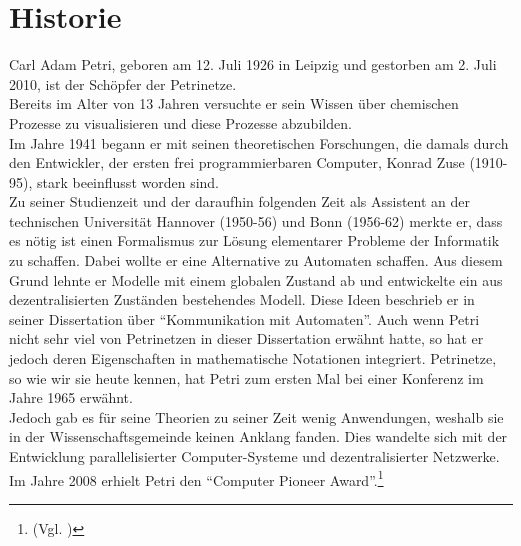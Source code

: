 \section{Historie}
Carl Adam Petri, geboren am 12. Juli 1926 in Leipzig und gestorben am 2. Juli 2010, ist der Schöpfer der Petrinetze. \\
Bereits im Alter von 13 Jahren versuchte er sein Wissen über chemischen Prozesse zu visualisieren und diese Prozesse abzubilden.\\
Im Jahre 1941 begann er mit seinen theoretischen Forschungen, die damals durch den Entwickler, der ersten frei programmierbaren Computer, Konrad Zuse (1910-95), stark beeinflusst worden sind.\\
Zu seiner Studienzeit und der daraufhin folgenden Zeit als Assistent an der technischen Universität Hannover (1950-56) und Bonn (1956-62) merkte er, dass es nötig ist einen Formalismus zur Lösung elementarer Probleme der Informatik zu schaffen.
Dabei wollte er eine Alternative zu Automaten schaffen.
Aus diesem Grund lehnte er Modelle mit einem globalen Zustand ab und entwickelte ein aus dezentralisierten Zuständen bestehendes Modell.
Diese Ideen beschrieb er in seiner Dissertation über \enquote{Kommunikation mit Automaten}.
Auch wenn Petri nicht sehr viel von Petrinetzen in dieser Dissertation erwähnt hatte, so hat er jedoch deren Eigenschaften in mathematische Notationen integriert.
Petrinetze, so wie wir sie heute kennen, hat Petri zum ersten Mal bei einer Konferenz im Jahre 1965 erwähnt. \\ Jedoch gab es für seine Theorien zu seiner Zeit wenig Anwendungen, weshalb sie in der Wissenschaftsgemeinde keinen Anklang fanden. Dies wandelte sich mit der Entwicklung parallelisierter Computer-Systeme und dezentralisierter Netzwerke. Im Jahre 2008 erhielt Petri den \enquote{Computer Pioneer Award}.\footnote{(Vgl. \cite{uni_hamburg:pioneerAward})}
